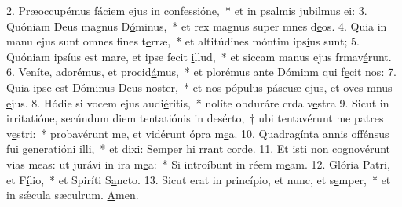 2. Præoccupémus fáciem ejus in confessi\uline{ó}ne,~* et in psalmis jubilmus \uline{e}i:
3. Quóniam Deus magnus D\uline{ó}minus,~* et rex magnus super mnes d\uline{e}os.
4. Quia in manu ejus sunt omnes fines t\uline{e}rræ,~* et altitúdines móntim ips\uline{í}us sunt;
5. Quóniam ipsíus est mare, et ipse fecit \uline{i}llud,~* et siccam manus ejus frmav\uline{é}runt.
6. Veníte, adorémus, et procid\uline{á}mus,~* et plorémus ante Dóminm qui f\uline{e}cit nos:
7. Quia ipse est Dóminus Deus n\uline{o}ster,~* et nos pópulus páscuæ ejus, et oves mnus \uline{e}jus.
8. Hódie si vocem ejus audi\uline{é}ritis,~* nolíte obduráre crda v\uline{e}stra
9. Sicut in irritatióne, secúndum diem tentatiónis in desérto,~† ubi tentavérunt me patres v\uline{e}stri:~* probavérunt me, et vidérunt ópra m\uline{e}a.
10. Quadragínta annis offénsus fui generatióni \uline{i}lli,~* et dixi: Semper hi rrant c\uline{o}rde.
11. Et isti non cognovérunt vias meas: ut jurávi in ira m\uline{e}a:~* Si introíbunt in réem m\uline{e}am.
12. Glória Patri, et F\uline{í}lio,~* et Spiríti S\uline{a}ncto.
13. Sicut erat in princípio, et nunc, et s\uline{e}mper,~* et in sǽcula sæculrum. \uline{A}men.
